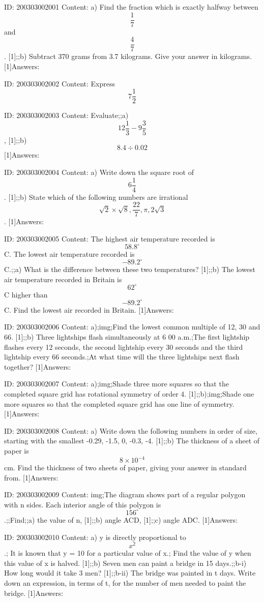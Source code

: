 \documentclass{article}
\begin{document}
ID: 200303002001
Content:
a) Find the fraction which is exactly halfway between $$\frac{1}{7}$$ and $$\frac{4}{7}$$.   [1];;b) Subtract 370 grams from 3.7 kilograms. Give your answer in kilograms.   [1]Answers:

ID: 200303002002
Content:
Express $$7 \frac{1}{2}$$%

ID: 200303002003
Content:
Evaluate;;a) $$12 \frac{1}{3} - 9 \frac{3}{5}$$,   [1];;b) $$8.4 \div 0.02$$ [1]Answers:

ID: 200303002004
Content:
a) Write down the square root of $$6 \frac{1}{4}$$.   [1];;b) State which of the following numbers are irrational $$\sqrt{2} \times \sqrt{8}, \frac{22}{7}, \pi, 2\sqrt{3}$$. [1]Answers:

ID: 200303002005
Content:
The highest air temperature recorded is $$58.8^{\circ}$$C. The lowest air temperature recorded is $$-89.2^{\circ}$$C.;;a) What is the difference between these two temperatures?   [1];;b) The lowest air temperature recorded in Britain is $$62^{\circ}$$C higher than $$-89.2^{\circ}$$C. Find the lowest air recorded in Britain.   [1]Answers:

ID: 200303002006
Content:
a);img;Find the lowest common multiple of 12, 30 and 66.   [1];;b) Three lightships flash simultaneously at 6 00 a.m.;The first lightship flashes every 12 seconds, the second lightship every 30 seconds and the third lightship every 66 seconds.;At what time will the three lightships next flash together?   [1]Answers:

ID: 200303002007
Content:
a);img;Shade three more squares so that the completed square grid has rotational symmetry of order 4.   [1];;b);img;Shade one more squares so that the completed square grid has one line of symmetry.   [1]Answers:

ID: 200303002008
Content:
a) Write down the following numbers in order of size, starting with the smallest -0.29, -1.5,  0,  -0.3,  -4. [1];;b) The thickness of a sheet of paper is $$8 \times 10^{-4}$$ cm. Find the thickness of two sheets of paper, giving your answer in standard from.   [1]Answers:

ID: 200303002009
Content:
img;The diagram shows part of a regular polygon with n sides. Each interior angle of this polygon is $$156^{\circ}$$.;;Find;;a) the value of n,   [1];;b) angle ACD,   [1];;c) angle ADC.   [1]Answers:

ID: 200303002010
Content:
a) y is directly proportional to $$x^2$$.; It is known that y = 10 for a particular value of x.; Find the value of y when this value of x is halved.   [1];;b) Seven men can paint a bridge in 15 days.;;b-i) How long would it take 3 men?   [1];;b-ii) The bridge was painted in t days. Write down an expression, in terms of t, for the number of men needed to paint the bridge.   [1]Answers:
\end{document}
